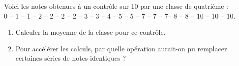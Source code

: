 
Voici les notes obtenues à un contrôle sur 10 par une classe de quatrième :\\
0 -- 1 -- 1 -- 2 -- 2 -- 2 -- 2 -- 3 -- 3 -- 4 -- 5 -- 5 -- 7 -- 7 -- 7--
8 -- 8 -- 10 -- 10 -- 10.
\begin{enumerate}
\item Calculer la moyenne de la classe pour ce contrôle.
\item Pour accélérer les calculs, par quelle opération aurait-on pu
	remplacer certaines séries de notes identiques ?
\end{enumerate}